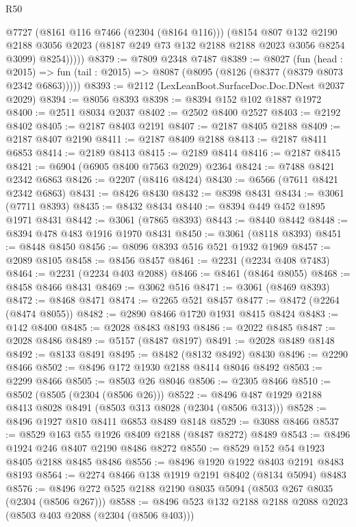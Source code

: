 \begin{lexlean}{R50}
\begin{coremodule}
            @7727
            (@8161 @116 @7466 (@2304 (@8164 @116)))
            (@8154
              @807
              @132
              @2190
              @2188
              @3056
              @2023
              (@8187 @249 @73 @132 @2188 @2188 @2023 @3056 @8254 @3099)
              @8254)))))
@8379 := @7809 @2348 @7487
@8389 := @8027
    (fun (head : @2015) =>
    fun (tail : @2015) => @8087 (@8095 (@8126 (@8377 (@8379 @8073 @2342 @6863)))))
@8393 := @2112 (LexLeanBoot.SurfaceDoc.Doc.DNest @2037 @2029)
@8394 := @8056 @8393
@8398 := @8394 @152 @102 @1887 @1972
@8400 := @2511 @8034 @2037
@8402 := @2502 @8400 @2527
@8403 := @2192 @8402
@8405 := @2187 @8403 @2191
@8407 := @2187 @8405 @2188
@8409 := @2187 @8407 @2190
@8411 := @2187 @8409 @2188
@8413 := @2187 @8411 @6853
@8414 := @2189 @8413
@8415 := @2189 @8414
@8416 := @2187 @8415
@8421 := @6904 (@6905 @8400 @7563 @2029) @2364
@8424 := @7488 @8421 @2342 @6863
@8426 := @2207 (@8416 @8424)
@8430 := @6566 (@7611 @8421 @2342 @6863)
@8431 := @8426 @8430
@8432 := @8398 @8431
@8434 := @3061 (@7711 @8393)
@8435 := @8432 @8434
@8440 := @8394 @449 @452 @1895 @1971 @8431
@8442 := @3061 (@7865 @8393)
@8443 := @8440 @8442
@8448 := @8394 @478 @483 @1916 @1970 @8431
@8450 := @3061 (@8118 @8393)
@8451 := @8448 @8450
@8456 := @8096 @8393 @516 @521 @1932 @1969
@8457 := @2089 @8105
@8458 := @8456 @8457
@8461 := @2231 (@2234 @408 @7483)
@8464 := @2231 (@2234 @403 @2088)
@8466 := @8461 (@8464 @8055)
@8468 := @8458 @8466 @8431
@8469 := @3062 @516
@8471 := @3061 (@8469 @8393)
@8472 := @8468 @8471
@8474 := @2265 @521 @8457
@8477 := @8472 (@2264 (@8474 @8055))
@8482 := @2890 @8466 @1720 @1931 @8415 @8424
@8483 := @142 @8400
@8485 := @2028 @8483 @8193
@8486 := @2022 @8485
@8487 := @2028 @8486
@8489 := @5157 (@8487 @8197)
@8491 := @2028 @8489 @8148
@8492 := @8133 @8491
@8495 := @8482 (@8132 @8492) @8430
@8496 := @2290 @8466
@8502 := @8496 @172 @1930 @2188 @8414 @8046 @8492
@8503 := @2299 @8466
@8505 := @8503 @26 @8046
@8506 := @2305 @8466
@8510 := @8502 (@8505 (@2304 (@8506 @26)))
@8522 := @8496 @487 @1929 @2188 @8413 @8028 @8491 (@8503 @313 @8028 (@2304 (@8506 @313)))
@8528 := @8496 @1927 @810 @8411 @6853 @8489 @8148
@8529 := @3088 @8466
@8537 := @8529 @163 @55 @1926 @8409 @2188 (@8487 @8272) @8489
@8543 := @8496 @1924 @246 @8407 @2190 @8486 @8272
@8550 := @8529 @152 @54 @1923 @8405 @2188 @8485 @8486
@8556 := @8496 @1920 @1922 @8403 @2191 @8483 @8193
@8564 := @2274 @8466 @138 @1919 @2191 @8402 (@8134 @5094) @8483
@8576 := @8496 @272 @525 @2188 @2190 @8035 @5094 (@8503 @267 @8035 (@2304 (@8506 @267)))
@8588 := @8496 @523 @132 @2188 @2188 @2088 @2023 (@8503 @403 @2088 (@2304 (@8506 @403)))

\end{coremodule}
\end{lexlean}
